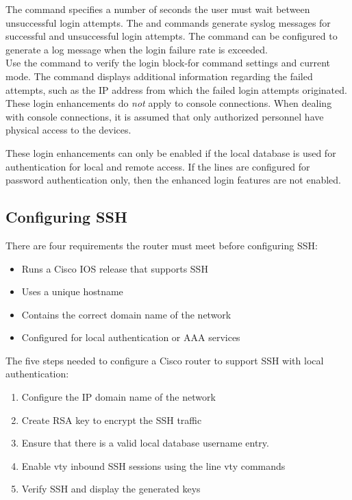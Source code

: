 The  command specifies a number of seconds the user must wait between unsuccessful login attempts. The  and  commands generate syslog messages for successful and unsuccessful login attempts. The  command can be configured to generate a log message when the login failure rate is exceeded.\\

Use the  command to verify the login block-for command settings and current mode. The  command displays additional information regarding the failed attempts, such as the IP address from which the failed login attempts originated.\\

These login enhancements do \emph{not} apply to console connections. When dealing with console connections, it is assumed that only authorized personnel have physical access to the devices.

\note These login enhancements can only be enabled if the local database is used for authentication for local and remote access. If the lines are configured for password authentication only, then the enhanced login features are not enabled.

\subsection{Configuring SSH}

There are four requirements the router must meet before configuring SSH:

\begin{itemize}
\item Runs a Cisco IOS release that supports SSH
\item Uses a unique hostname
\item Contains the correct domain name of the network
\item Configured for local authentication or AAA services
\end{itemize}

The five steps needed to configure a Cisco router to support SSH with local authentication:

\begin{enumerate}
\item Configure the IP domain name of the network
\item Create RSA key to encrypt the SSH traffic
\item Ensure that there is a valid local database username entry.
\item Enable vty inbound SSH sessions using the line vty commands
\item Verify SSH and display the generated keys
\end{enumerate}


